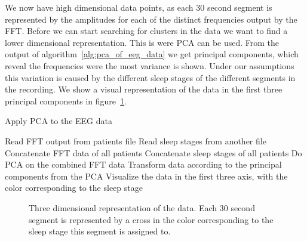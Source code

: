 We now have high dimensional data points, as each 30 second segment is represented by the amplitudes for each of the distinct frequencies output by the FFT. Before we can start searching for clusters in the data we want to find a lower dimensional representation. This is were PCA can be used. From the output of algorithm~\ref{alg:pca_of_eeg_data} we get principal components, which reveal the frequencies were the most variance is shown. Under our assumptions this variation is caused by the different sleep stages of the different segments in the recording. We show a visual representation of the data in the first three principal components in figure~\ref{fig:pca_output_3d}.

\begin{algorithm}
	\caption{Apply PCA to the EEG data}\label{alg:pca_of_eeg_data}
	\begin{algorithmic}
			\State Read FFT output from patients file
			\State Read sleep stages from another file
		\EndFor
		\State Concatenate FFT data of all patients
		\State Concatenate sleep stages of all patients
		\State Do PCA on the combined FFT data
		\State Transform data according to the principal components from the PCA
		\State Visualize the data in the first three axis, with the color corresponding to the sleep stage
	\end{algorithmic}
\end{algorithm}

\begin{figure}
	\centering	
	\caption{Three dimensional representation of the data. Each 30 second segment is represented by a cross in the color corresponding to the sleep stage this segment is assigned to.}
	\label{fig:pca_output_3d}
\end{figure}

